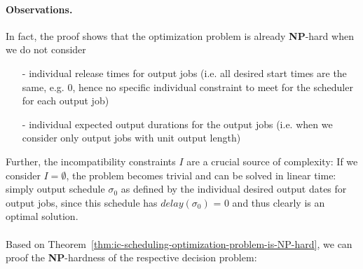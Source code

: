 \documentclass{article}
\begin{document}
\paragraph{Observations.} In fact, the proof shows that the optimization problem is already {\bf NP}-hard when we do not consider 
\begin{itemize}
\item[-]  individual release times for output jobs (i.e. all desired start times are the same, e.g. 0, hence no specific individual constraint to meet for the scheduler for each output job)
\item[-]  individual expected output durations for the output jobs (i.e. when we consider only output jobs with unit output length)
\end{itemize}

Further, the incompatibility constraints $I$ are a crucial source of complexity:  If we consider $I = \emptyset$, the problem becomes trivial and can be solved in linear time: simply output schedule $\sigma_0$ as defined by the individual desired output dates for output jobs, since this schedule  has ${delay}(\sigma_0)$ = 0 and thus clearly is an optimal solution.

\paragraph{}
Based on Theorem~\ref{thm:ic-scheduling-optimization-problem-is-NP-hard}, we can proof the {\bf NP}-hardness of the respective decision problem:
\end{document}

